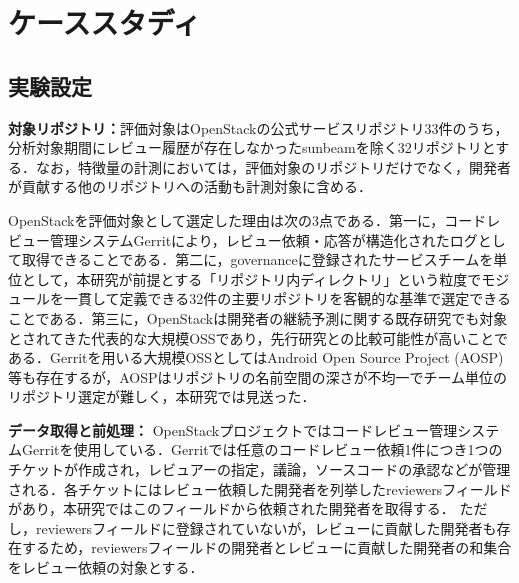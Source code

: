 \documentclass[submit,noauthor,ses,dvipdfmx]{ipsj}
\newcommand{\todo}[1]{\colorbox{yellow}{{\bf TODO}:}{\color{red} {\textbf{[#1]}}}}
\newcommand{\fixstart}{\color{magenta}}
\newcommand{\fixend}{\color{black}}
\begin{document}
\section{ケーススタディ}\label{sec:case}

\subsection{実験設定}

\noindent\textbf{対象リポジトリ：}評価対象はOpenStackの公式サービスリポジトリ33件のうち，分析対象期間にレビュー履歴が存在しなかったsunbeamを除く32リポジトリとする．なお，特徴量の計測においては，評価対象のリポジトリだけでなく，開発者が貢献する他のリポジトリへの活動も計測対象に含める．

\fixstart
OpenStackを評価対象として選定した理由は次の3点である．第一に，コードレビュー管理システムGerritにより，レビュー依頼・応答が構造化されたログとして取得できることである．第二に，governanceに登録されたサービスチームを単位として，本研究が前提とする「リポジトリ内ディレクトリ」という粒度でモジュールを一貫して定義できる32件の主要リポジトリを客観的な基準で選定できることである．第三に，OpenStackは開発者の継続予測に関する既存研究\cite{zhou}\cite{bao}\cite{constantinou}でも対象とされてきた代表的な大規模OSSであり，先行研究との比較可能性が高いことである．Gerritを用いる大規模OSSとしてはAndroid Open Source Project (AOSP) 等も存在するが，AOSPはリポジトリの名前空間の深さが不均一でチーム単位のリポジトリ選定が難しく，本研究では見送った．
\fixend

\noindent\textbf{データ取得と前処理：}
OpenStackプロジェクトではコードレビュー管理システムGerritを使用している．Gerritでは任意のコードレビュー依頼1件につき1つのチケットが作成され，レビュアーの指定，議論，ソースコードの承認などが管理される．各チケットにはレビュー依頼した開発者を列挙したreviewersフィールドがあり，本研究ではこのフィールドから依頼された開発者を取得する．
ただし，reviewersフィールドに登録されていないが，レビューに貢献した開発者も存在するため，reviewersフィールドの開発者とレビューに貢献した開発者の和集合をレビュー依頼の対象とする．
\end{document}
